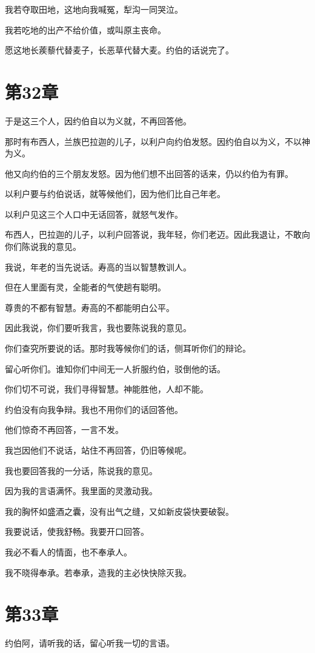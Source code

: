 \documentclass[12pt,oneside]{book}
\begin{document}
我若夺取田地，这地向我喊冤，犁沟一同哭泣。

我若吃地的出产不给价值，或叫原主丧命。

愿这地长蒺藜代替麦子，长恶草代替大麦。约伯的话说完了。


\chapter{第32章}
于是这三个人，因约伯自以为义就，不再回答他。

那时有布西人，兰族巴拉迦的儿子，以利户向约伯发怒。因约伯自以为义，不以神为义。

他又向约伯的三个朋友发怒。因为他们想不出回答的话来，仍以约伯为有罪。

以利户要与约伯说话，就等候他们，因为他们比自己年老。

以利户见这三个人口中无话回答，就怒气发作。

布西人，巴拉迦的儿子，以利户回答说，我年轻，你们老迈。因此我退让，不敢向你们陈说我的意见。

我说，年老的当先说话。寿高的当以智慧教训人。

但在人里面有灵，全能者的气使趟有聪明。

尊贵的不都有智慧。寿高的不都能明白公平。

因此我说，你们要听我言，我也要陈说我的意见。

你们查究所要说的话。那时我等候你们的话，侧耳听你们的辩论。

留心听你们。谁知你们中间无一人折服约伯，驳倒他的话。

你们切不可说，我们寻得智慧。神能胜他，人却不能。

约伯没有向我争辩。我也不用你们的话回答他。

他们惊奇不再回答，一言不发。

我岂因他们不说话，站住不再回答，仍旧等候呢。

我也要回答我的一分话，陈说我的意见。

因为我的言语满怀。我里面的灵激动我。

我的胸怀如盛酒之囊，没有出气之缝，又如新皮袋快要破裂。

我要说话，使我舒畅。我要开口回答。

我必不看人的情面，也不奉承人。

我不晓得奉承。若奉承，造我的主必快快除灭我。


\chapter{第33章}
约伯阿，请听我的话，留心听我一切的言语。
\end{document}
